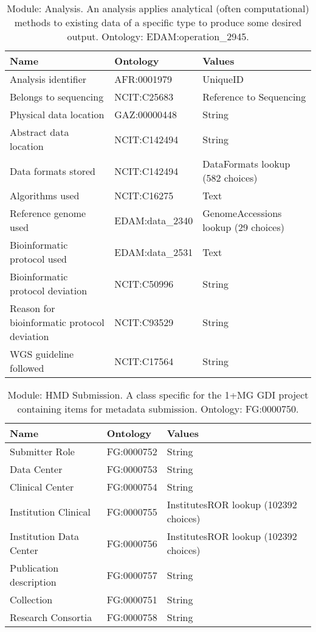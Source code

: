 \documentclass{article}
\begin{document}
\begin{table}[htb]
\begin{tabular}{lll}
Name & Ontology & Values \\
\hline
Analysis identifier & AFR:0001979 & UniqueID \\
Belongs to sequencing & NCIT:C25683 & Reference to Sequencing \\
Physical data location & GAZ:00000448 & String \\
Abstract data location & NCIT:C142494 & String \\
Data formats stored & NCIT:C142494 & DataFormats lookup (582 choices) \\
Algorithms used & NCIT:C16275 & Text \\
Reference genome used & EDAM:data\_2340 & GenomeAccessions lookup (29 choices) \\
Bioinformatic protocol used & EDAM:data\_2531 & Text \\
Bioinformatic protocol deviation & NCIT:C50996 & String \\
Reason for bioinformatic protocol deviation & NCIT:C93529 & String \\
WGS guideline followed & NCIT:C17564 & String \\
\hline
\end{tabular}
\caption[Module: Analysis]{\label{table:table11} Module: Analysis. An analysis applies analytical (often computational) methods to existing data of a specific type to produce some desired output. Ontology: EDAM:operation\_2945. }
\end{table}

\begin{table}[htb]
\begin{tabular}{lll}
Name & Ontology & Values \\
\hline
Submitter Role & FG:0000752 & String \\
Data Center & FG:0000753 & String \\
Clinical Center & FG:0000754 & String \\
Institution Clinical & FG:0000755 & InstitutesROR lookup (102392 choices) \\
Institution Data Center & FG:0000756 & InstitutesROR lookup (102392 choices) \\
Publication description & FG:0000757 & String \\
Collection & FG:0000751 & String \\
Research Consortia & FG:0000758 & String \\
\hline
\end{tabular}
\caption[Module: HMD Submission]{\label{table:table12} Module: HMD Submission. A class specific for the 1+MG GDI project containing items for metadata submission. Ontology: FG:0000750. }
\end{table}
\end{document}
